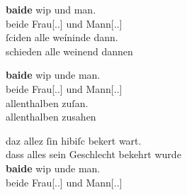 \begin{exe}
\ex \label{ex:konjmixbeide2}
	\begin{xlist}
	\ex \label{ex:konjmixbeide2_1}
		\gll \textbf{baide} wip und man. \\
			beide Frau[\Nom.\Pl.\NeutF] und Mann[\Nom.\Pl.\MascM] \\ %
	\sn \gll ſciden alle weíninde dann. \\
			schieden alle weinend dannen \\
		\begin{taggedline}{\parencites[\pno~7\ra, 38--39]{kc:A1}[vgl.][1564--1565]{schroeder1895}}
		\trans {}
		\end{taggedline}

	\ex \label{ex:konjmixbeide2_2}
		\gll \textbf{baide} wip unde man. \\
			beide Frau[\Nom.\NeutF.\Pl] und Mann[\Nom.\Pl.\MascM] \\ %
	\sn \gll allenthalben zuſan. \\
			allenthalben zusahen \\
		\begin{taggedline}{\parencites[\pno~58\va, 44--45]{kc:A1}[vgl.][13573--13574]{schroeder1895}}
		\trans {}
		\end{taggedline}

	\ex \label{ex:konjmixbeide2_3}
		\gll daz allez ſin hibiſc bekert wart. \\
			dass alles sein Geschlecht bekehrt wurde \\
	\sn \gll \textbf{baide} wip unde man. \\
			beide Frau[\Nom.\Pl.\NeutF] und Mann[\Nom.\Pl.\MascM] \\
		\begin{taggedline}{\parencites[\pno~27\va, 9--11]{kc:A1}[6360--6361]{schroeder1895}}
		\trans {}
		\end{taggedline}


\end{xlist}
\end{exe}
